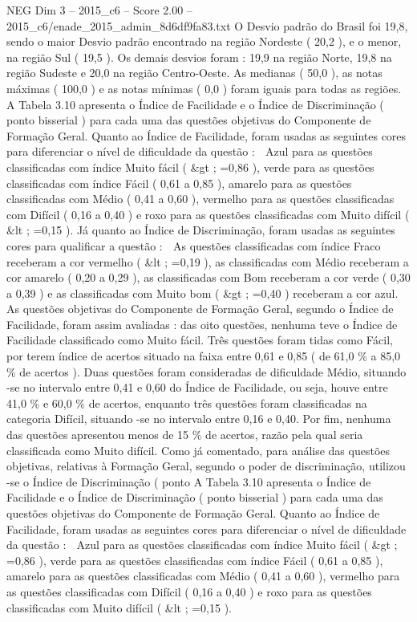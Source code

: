 \begin{textsample}{NEG Dim 3 – 2015\_c6 – Score 2.00 – 2015\_c6/enade\_2015\_admin\_8d6df9fa83.txt}
O Desvio padrão do Brasil foi 19,8, sendo o maior Desvio padrão encontrado na região Nordeste ( 20,2 ), e o menor, na região Sul ( 19,5 ).
Os demais desvios foram : 19,9 na região Norte, 19,8 na região Sudeste e 20,0 na região Centro-Oeste.
As medianas ( 50,0 ), as notas máximas ( 100,0 ) e as notas mínimas ( 0,0 ) foram iguais para todas as regiões.
A Tabela 3.10 apresenta o Índice de Facilidade e o Índice de Discriminação ( ponto bisserial ) para cada uma das questões objetivas do Componente de Formação Geral.
Quanto ao Índice de Facilidade, foram usadas as seguintes cores para diferenciar o nível de dificuldade da questão :  Azul para as questões classificadas com índice Muito fácil ( \&gt ; =0,86 ), verde para as questões classificadas com índice Fácil ( 0,61 a 0,85 ), amarelo para as questões classificadas com Médio ( 0,41 a 0,60 ), vermelho para as questões classificadas com Difícil ( 0,16 a 0,40 ) e roxo para as questões classificadas com Muito difícil ( \&lt ; =0,15 ).
Já quanto ao Índice de Discriminação, foram usadas as seguintes cores para qualificar a questão :  As questões classificadas com índice Fraco receberam a cor vermelho ( \&lt ; =0,19 ), as classificadas com Médio receberam a cor amarelo ( 0,20 a 0,29 ), as classificadas com Bom receberam a cor verde ( 0,30 a 0,39 ) e as classificadas com Muito bom ( \&gt ; =0,40 ) receberam a cor azul.
As questões objetivas do Componente de Formação Geral, segundo o Índice de Facilidade, foram assim avaliadas : das oito questões, nenhuma teve o Índice de Facilidade classificado como Muito fácil.
Três questões foram tidas como Fácil, por terem índice de acertos situado na faixa entre 0,61 e 0,85 ( de 61,0 \% a 85,0 \% de acertos ).
Duas questões foram consideradas de dificuldade Médio, situando -se no intervalo entre 0,41 e 0,60 do Índice de Facilidade, ou seja, houve entre 41,0 \% e 60,0 \% de acertos, enquanto três questões foram classificadas na categoria Difícil, situando -se no intervalo entre 0,16 e 0,40.
Por fim, nenhuma das questões apresentou menos de 15 \% de acertos, razão pela qual seria classificada como Muito difícil.
Como já comentado, para análise das questões objetivas, relativas à Formação Geral, segundo o poder de discriminação, utilizou -se o Índice de Discriminação ( ponto A Tabela 3.10 apresenta o Índice de Facilidade e o Índice de Discriminação ( ponto bisserial ) para cada uma das questões objetivas do Componente de Formação Geral.
Quanto ao Índice de Facilidade, foram usadas as seguintes cores para diferenciar o nível de dificuldade da questão :  Azul para as questões classificadas com índice Muito fácil ( \&gt ; =0,86 ), verde para as questões classificadas com índice Fácil ( 0,61 a 0,85 ), amarelo para as questões classificadas com Médio ( 0,41 a 0,60 ), vermelho para as questões classificadas com Difícil ( 0,16 a 0,40 ) e roxo para as questões classificadas com Muito difícil ( \&lt ; =0,15 ).

\end{textsample}
